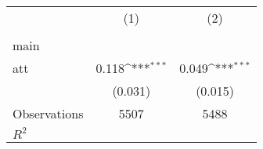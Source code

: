 {
\def\sym#1{\ifmmode^{#1}\else\(^{#1}\)\fi}
\begin{tabular}{l*{2}{c}}
\hline\hline
                    &\multicolumn{1}{c}{(1)}&\multicolumn{1}{c}{(2)}\\
                    &\multicolumn{1}{c}{} &\multicolumn{1}{c}{} \\
\hline
main                &                     &                     \\
att                 &       0.118\sym{***}&       0.049\sym{***}\\
                    &     (0.031)         &     (0.015)         \\
\hline
Observations        &        5507         &        5488         \\
\(R^{2}\)           &                     &                     \\
\hline\hline
\end{tabular}
}
